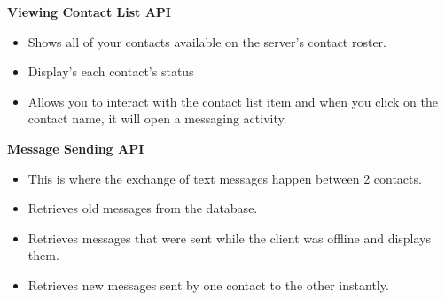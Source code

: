 \documentclass[29pt,a4paper]{moderncv}
\begin{document}
		\noindent \textbf{Viewing Contact List API}
			\begin{itemize}
				\item Shows all of your contacts available on the server’s contact roster.
				\item Display’s each contact’s status
				\item Allows you to interact with the contact list item and when you click on the contact name, it will open a messaging activity.\\
			\end{itemize}
		
		\noindent \textbf{Message Sending API}
			\begin{itemize}
				\item This is where the exchange of text messages happen between 2 contacts. 
				\item Retrieves old messages from the database.
				\item Retrieves messages that were sent while the client was offline and displays them.
				\item Retrieves new messages sent by one contact to the other instantly.\\
			\end{itemize}
	
\end{document}
